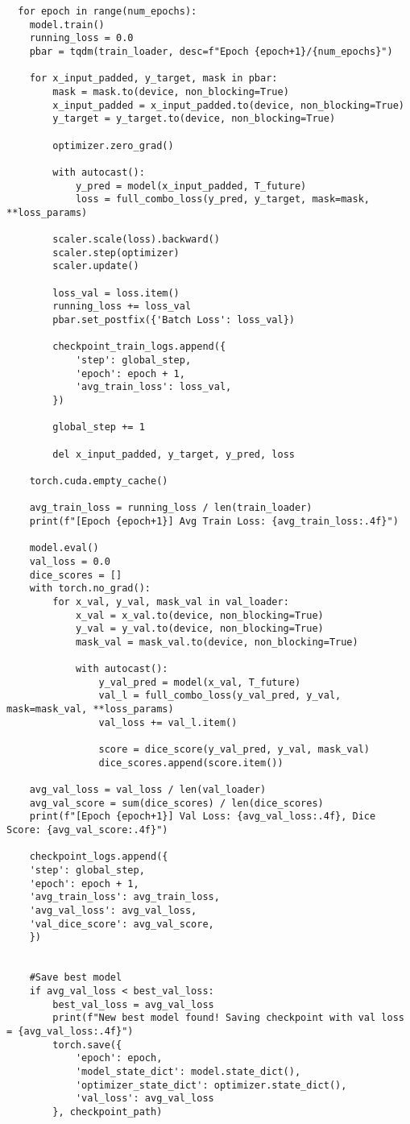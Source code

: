 \documentclass[a4paper,12pt]{article}
\begin{document}
\begin{lstlisting}
  for epoch in range(num_epochs):
    model.train()
    running_loss = 0.0
    pbar = tqdm(train_loader, desc=f"Epoch {epoch+1}/{num_epochs}")

    for x_input_padded, y_target, mask in pbar:
        mask = mask.to(device, non_blocking=True)
        x_input_padded = x_input_padded.to(device, non_blocking=True)
        y_target = y_target.to(device, non_blocking=True)

        optimizer.zero_grad()

        with autocast():
            y_pred = model(x_input_padded, T_future)
            loss = full_combo_loss(y_pred, y_target, mask=mask, **loss_params)

        scaler.scale(loss).backward()
        scaler.step(optimizer)
        scaler.update()

        loss_val = loss.item()
        running_loss += loss_val
        pbar.set_postfix({'Batch Loss': loss_val})

        checkpoint_train_logs.append({
            'step': global_step,
            'epoch': epoch + 1,
            'avg_train_loss': loss_val,
        })

        global_step += 1

        del x_input_padded, y_target, y_pred, loss

    torch.cuda.empty_cache()

    avg_train_loss = running_loss / len(train_loader)
    print(f"[Epoch {epoch+1}] Avg Train Loss: {avg_train_loss:.4f}")

    model.eval()
    val_loss = 0.0
    dice_scores = []
    with torch.no_grad():
        for x_val, y_val, mask_val in val_loader:
            x_val = x_val.to(device, non_blocking=True)
            y_val = y_val.to(device, non_blocking=True)
            mask_val = mask_val.to(device, non_blocking=True)

            with autocast():
                y_val_pred = model(x_val, T_future)
                val_l = full_combo_loss(y_val_pred, y_val, mask=mask_val, **loss_params)
                val_loss += val_l.item()

                score = dice_score(y_val_pred, y_val, mask_val)
                dice_scores.append(score.item())

    avg_val_loss = val_loss / len(val_loader)
    avg_val_score = sum(dice_scores) / len(dice_scores)
    print(f"[Epoch {epoch+1}] Val Loss: {avg_val_loss:.4f}, Dice Score: {avg_val_score:.4f}")

    checkpoint_logs.append({
    'step': global_step,
    'epoch': epoch + 1,
    'avg_train_loss': avg_train_loss,
    'avg_val_loss': avg_val_loss,
    'val_dice_score': avg_val_score,
    })


    #Save best model
    if avg_val_loss < best_val_loss:
        best_val_loss = avg_val_loss
        print(f"New best model found! Saving checkpoint with val loss = {avg_val_loss:.4f}")
        torch.save({
            'epoch': epoch,
            'model_state_dict': model.state_dict(),
            'optimizer_state_dict': optimizer.state_dict(),
            'val_loss': avg_val_loss
        }, checkpoint_path)

\end{lstlisting}
\end{document}
